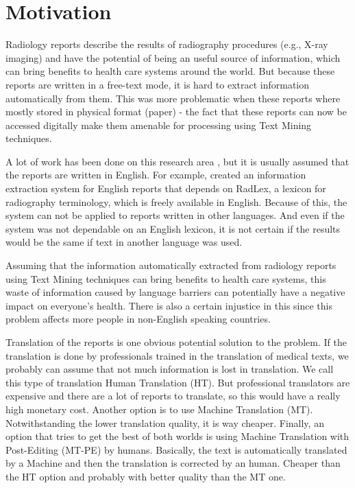 \label{chap1}

\section{Motivation}
\label{motivation}

Radiology reports describe the results of radiography procedures (e.g., X-ray imaging) and have the potential of being an useful source of information, which can bring benefits to health care systems around the world. But because these reports are written in a free-text mode, it is hard to extract information automatically from them. This was more problematic when these reports where mostly stored in physical format (paper) - the fact that these reports can now be accessed digitally make them amenable for processing using Text Mining techniques. 

A lot of work has been done on this research area \citep{Pons2016}, but it is usually assumed that the reports are written in English. For example, \citep{Hassanpour2016} created an information extraction system for English reports that depends on RadLex, a lexicon for radiography terminology, which is freely available in English. Because of this, the system can not be applied to reports written in other languages. And even if the system was not dependable on an English lexicon, it is not certain if the results would be the same if text in another language was used.

Assuming that the information automatically extracted from radiology reports using Text Mining techniques can bring benefits to health care systems, this waste of information caused by language barriers can potentially have a negative impact on everyone's health. There is also a certain injustice in this since this problem affects more people in non-English speaking countries. 

Translation of the reports is one obvious potential solution to the problem. If the translation is done by professionals trained in the translation of medical texts, we probably can assume that not much information is lost in translation. We call this type of translation Human Translation (HT). But professional translators are expensive and there are a lot of reports to translate, so this would have a really high monetary cost. Another option is to use Machine Translation (MT). Notwithstanding the lower translation quality, it is way cheaper. Finally, an option that tries to get the best of both worlds is using Machine Translation with Post-Editing (MT-PE) by humans. Basically, the text is automatically translated by a Machine and then the translation is corrected by an human. Cheaper than the HT option and probably with better quality than the MT one. 


